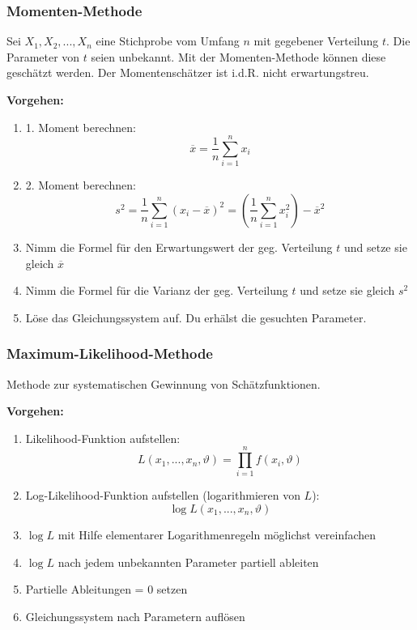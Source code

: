 \documentclass[10pt,a4paper,twocolumn]{article}
\begin{document}
\subsubsection{Momenten-Methode}
Sei $X_1,X_2,...,X_n$ eine Stichprobe vom Umfang $n$ mit gegebener Verteilung $t$. Die Parameter von $t$ seien unbekannt. Mit der Momenten-Methode können diese geschätzt werden. Der Momentenschätzer ist i.d.R. nicht erwartungstreu.

\vspace{10pt}

\textbf{Vorgehen:}
\begin{enumerate}
\item 1. Moment berechnen:
\[
\overline{x} = \frac{1}{n}\sum\limits_{i=1}^{n}x_i
\]
\item 2. Moment berechnen:
\[
s^2 = \frac{1}{n}\sum\limits_{i=1}^{n}\left(x_i - \overline{x}\right)^2=\left( \frac{1}{n}\sum\limits_{i=1}^{n}x_i^2\right)-\overline{x}^2
\]
\item Nimm die Formel für den Erwartungswert der geg. Verteilung $t$ und setze sie gleich $\overline{x}$
\item Nimm die Formel für die Varianz der geg. Verteilung $t$ und setze sie gleich $s^2$
\item Löse das Gleichungssystem auf. Du erhälst die gesuchten Parameter.
\end{enumerate}

\subsubsection{Maximum-Likelihood-Methode}
Methode zur systematischen Gewinnung von Schätzfunktionen.

\vspace{10pt}

\textbf{Vorgehen:}
\begin{enumerate}
\item Likelihood-Funktion aufstellen:
\[
L(x_1,...,x_n,\vartheta)= \prod \limits_{i=1}^{n} f(x_i,\vartheta)
\]
\item Log-Likelihood-Funktion aufstellen (logarithmieren von $L$):
\[
\log L(x_1,...,x_n,\vartheta)
\]
\item $\log L$ mit Hilfe elementarer Logarithmenregeln möglichst vereinfachen
\item $\log L$ nach jedem unbekannten Parameter partiell ableiten
\item Partielle Ableitungen = 0 setzen
\item Gleichungssystem nach Parametern auflösen
\end{enumerate}
\end{document}
